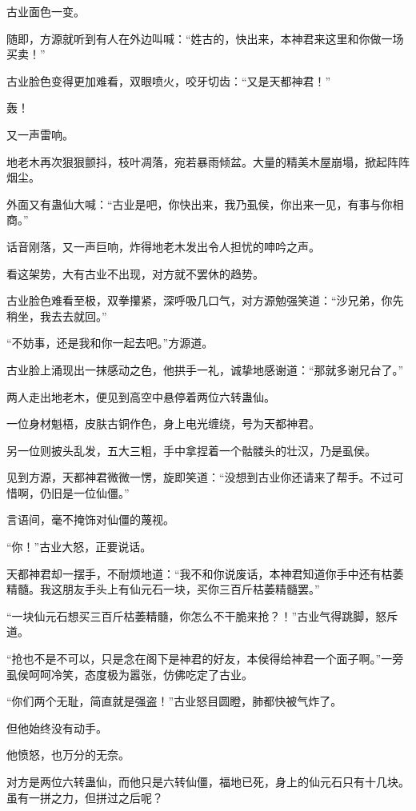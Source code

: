 \begin{this_body}
古业面色一变。

随即，方源就听到有人在外边叫喊：“姓古的，快出来，本神君来这里和你做一场买卖！”

古业脸色变得更加难看，双眼喷火，咬牙切齿：“又是天都神君！”

轰！

又一声雷响。

地老木再次狠狠颤抖，枝叶凋落，宛若暴雨倾盆。大量的精美木屋崩塌，掀起阵阵烟尘。

外面又有蛊仙大喊：“古业是吧，你快出来，我乃虱侯，你出来一见，有事与你相商。”

话音刚落，又一声巨响，炸得地老木发出令人担忧的呻吟之声。

看这架势，大有古业不出现，对方就不罢休的趋势。

古业脸色难看至极，双拳攥紧，深呼吸几口气，对方源勉强笑道：“沙兄弟，你先稍坐，我去去就回。”

“不妨事，还是我和你一起去吧。”方源道。

古业脸上涌现出一抹感动之色，他拱手一礼，诚挚地感谢道：“那就多谢兄台了。”

两人走出地老木，便见到高空中悬停着两位六转蛊仙。

一位身材魁梧，皮肤古铜作色，身上电光缠绕，号为天都神君。

另一位则披头乱发，五大三粗，手中拿捏着一个骷髅头的壮汉，乃是虱侯。

见到方源，天都神君微微一愣，旋即笑道：“没想到古业你还请来了帮手。不过可惜啊，仍旧是一位仙僵。”

言语间，毫不掩饰对仙僵的蔑视。

“你！”古业大怒，正要说话。

天都神君却一摆手，不耐烦地道：“我不和你说废话，本神君知道你手中还有枯萎精髓。我这朋友手头上有仙元石一块，买你三百斤枯萎精髓罢。”

“一块仙元石想买三百斤枯萎精髓，你怎么不干脆来抢？！”古业气得跳脚，怒斥道。

“抢也不是不可以，只是念在阁下是神君的好友，本侯得给神君一个面子啊。”一旁虱侯呵呵冷笑，态度极为嚣张，仿佛吃定了古业。

“你们两个无耻，简直就是强盗！”古业怒目圆瞪，肺都快被气炸了。

但他始终没有动手。

他愤怒，也万分的无奈。

对方是两位六转蛊仙，而他只是六转仙僵，福地已死，身上的仙元石只有十几块。虽有一拼之力，但拼过之后呢？


\end{this_body}
